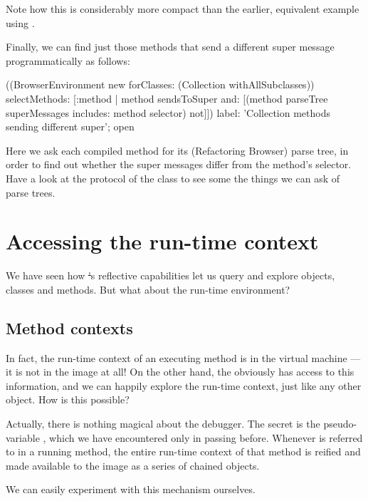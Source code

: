 \documentclass[a4paper,10pt,twoside]{book}
\begin{document}
Note how this is considerably more compact than the earlier, equivalent example using .

Finally, we can find just those methods that send a different super message programmatically as follows:
\begin{code}{}
((BrowserEnvironment new forClasses: (Collection withAllSubclasses))
        selectMethods: [:method |
                method sendsToSuper
                and: [(method parseTree superMessages includes: method selector) not]])
        label: 'Collection methods sending different super';
        open
\end{code}
Here we ask each compiled method for its (Refactoring Browser) parse tree, in order to find out whether the super messages differ from the method's selector.
Have a look at the  protocol of the class  to see some the things we can ask of parse trees.

\section{Accessing the run-time context}

We have seen how \st's reflective capabilities let us query and explore objects, classes and methods.  But what about the run-time environment?

\subsection{Method contexts}

In fact, the run-time context of an executing method is in the virtual machine --- it is not in the image at all!
On the other hand, the  obviously has access to this information, and we can happily explore the run-time context, just like any other object.
How is this possible?

Actually, there is nothing magical about the debugger.
The secret is the pseudo-variable , which we have encountered only in passing before.
Whenever  is referred to in a running method, the entire run-time context of that method is reified and made available to the image as a series of chained  objects.

We can easily experiment with this mechanism ourselves.
\end{document}
